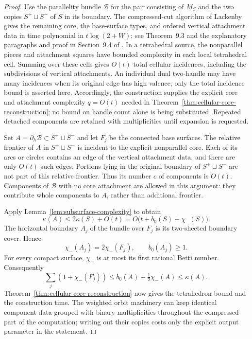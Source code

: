 \begin{proof}
Use the parallelity bundle $\mathcal B$ for the pair consisting of $M_S$
and the two copies $S^+\sqcup S^-$ of $S$ in its boundary.  The compressed-cut
algorithm of Lackenby gives the remaining core, the base-surface types, and
ordered vertical attachment data in time polynomial in
$t\log(2+W)$; see Theorem~9.3 and the explanatory paragraphs and proof in
Section~9.4 of \cite{Lackenby2021Certification}.  In a tetrahedral source,
the nonparallel pieces and attachment squares have bounded complexity in
each local tetrahedral cell.  Summing over these cells gives $O(t)$ total
cellular incidences, including the subdivisions of vertical attachments.
An individual dual two-handle may have many incidences when its original
edge has high valence; only the total incidence bound is asserted here.
Accordingly, the construction supplies the explicit core and attachment
complexity $q=O(t)$ needed in
Theorem~\ref{thm:cellular-core-reconstruction}; no bound on handle count alone
is being substituted.  Repeated detached components are retained with
multiplicities until expansion is requested.

Set $A=\partial_h\mathcal B\subset S^+\sqcup S^-$ and let $F_j$ be the
connected base surfaces.  The relative frontier of $A$ in
$S^+\sqcup S^-$ is incident to the explicit nonparallel core.  Each of its
arcs or circles contains an edge of the vertical attachment data, and there
are only $O(t)$ such edges.  Portions lying in the original boundary of
$S^+\sqcup S^-$ are not part of this relative frontier.  Thus its number
$c$ of components is $O(t)$.  Components of $\mathcal B$ with no core
attachment are allowed in this argument: they contribute whole components
to $A$, rather than additional frontier.

Apply Lemma~\ref{lem:subsurface-complexity} to obtain
\[
  \kappa(A)
  \leq 2\kappa(S)+O(t)
  =O\bigl(t+b_0(S)+\chi_-(S)\bigr).
\]
The horizontal boundary $A_j$ of the bundle over $F_j$ is its two-sheeted
boundary cover.  Hence
\[
  \chi_-(A_j)=2\chi_-(F_j),
  \qquad b_0(A_j)\geq 1.
\]
For every compact surface, $\chi_-$ is at most its first rational Betti
number.  Consequently
\[
  \sum_j(1+\chi_-(F_j))
  \leq b_0(A)+\tfrac12\chi_-(A)
  \leq\kappa(A).
\]
Theorem~\ref{thm:cellular-core-reconstruction} now gives the tetrahedron
bound and the construction time.  The weighted orbit machinery can keep
identical component data grouped with binary multiplicities throughout the
compressed part of the computation; writing out their copies costs only
the explicit output parameter in the statement.
\end{proof}

